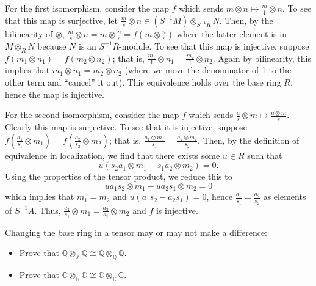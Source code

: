 \documentclass[../../master.tex]{subfiles}
\begin{document}
\begin{solution}
    For the first isomorphism, consider the map $f$ which sends $m \otimes n \mapsto \frac{m}{1} \otimes n$.
    To see that this map is surjective, let $\frac{m}{s} \otimes n \in (S^{-1}M) \otimes_{S^{-1}R} N$.
    Then, by the bilinearity of $\otimes$, $\frac{m}{s} \otimes n = m \otimes \frac{n}{s} = f(m \otimes \frac{n}{s})$ where the latter element is in $M \otimes_R N$ because $N$ is an $S^{-1}R$-module.
    To see that this map is injective, suppose $f(m_1 \otimes n_1) = f(m_2 \otimes n_2)$; that is, $\frac{m_1}{1} \otimes n_1 = \frac{m_2}{1} \otimes n_2$.
    Again by bilinearity, this implies that $m_1 \otimes n_1 = m_2 \otimes n_2$ (where we move the denominator of 1 to the other term and ``cancel'' it out).
    This equivalence holds over the base ring $R$, hence the map is injective.

    For the second isomorphism, consider the map $f$ which sends $\frac{a}{s} \otimes m \mapsto \frac{a \otimes m}{s}$.
    Clearly this map is surjective.
    To see that it is injective, suppose $f(\frac{a_1}{s_1} \otimes m_1) = f(\frac{a_2}{s_2} \otimes m_2)$; that is, $\frac{a_1 \otimes m_1}{s_1} = \frac{a_2 \otimes m_2}{s_2}$.
    Then, by the definition of equivalence in localization, we find that there exists some $u \in R$ such that
    \[
        u(s_2 a_1 \otimes m_1 - s_1 a_2 \otimes m_2) = 0.
    \]
    Using the properties of the tensor product, we reduce this to
    \[
    u a_1 s_2 \otimes m_1 - u a_2 s_1 \otimes m_2 = 0
    \]
    which implies that $m_1 = m_2$ and $u(a_1 s_2 - a_2 s_1) = 0$, hence $\frac{a_1}{s_1} = \frac{a_2}{s_2}$ as elements of $S^{-1}A$.
    Thus, $\frac{a_1}{s_1} \otimes m_1 = \frac{a_2}{s_2} \otimes m_2$ and $f$ is injective.
\end{solution}

\begin{problem}
    Changing the base ring in a tensor may or may not make a difference:
    \begin{itemize}
        \item Prove that $\mathbb{Q} \otimes_\mathbb{Z} \mathbb{Q} \cong \mathbb{Q} \otimes_\mathbb{Q} \mathbb{Q}$.
        \item Prove that $\mathbb{C} \otimes_\mathbb{R} \mathbb{C} \not\cong \mathbb{C} \otimes_\mathbb{C} \mathbb{C}$.
    \end{itemize}
\end{problem}
\end{document}
